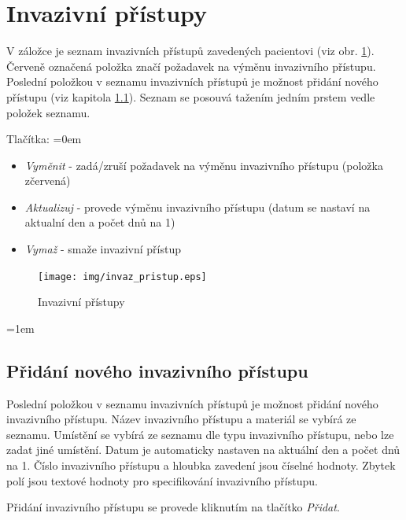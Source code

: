
\section{Invazivní přístupy}

V záložce je seznam invazivních přístupů zavedených pacientovi (viz obr. \ref{fig:pristupy}). Červeně označená položka značí požadavek na výměnu invazivního přístupu. Poslední položkou v seznamu invazivních přístupů je možnost přidání nového přístupu (viz kapitola \ref{sec:pridat_pristup}). Seznam se posouvá tažením jedním prstem vedle položek seznamu.

Tlačítka:
\parskip=0em
\begin{itemize}
	\item \emph{Vyměnit}		-	zadá/zruší požadavek na výměnu invazivního přístupu (položka zčervená)
	\item \emph{Aktualizuj}	-	provede výměnu invazivního přístupu (datum se nastaví na aktualní den a počet dnů na 1)
	\item \emph{Vymaž}			-	smaže invazivní přístup
\end{itemize}

\begin{figure}[H]
	\centering
	\texttt{[image: img/invaz\_pristup.eps]}
	\caption{Invazivní přístupy}
  \label{fig:pristupy}
\end{figure}
\parskip=1em

\subsection{Přidání nového invazivního přístupu}
\label{sec:pridat_pristup}

Poslední položkou v seznamu invazivních přístupů je možnost přidání nového invazivního přístupu. Název invazivního přístupu a materiál se vybírá ze seznamu. Umístění se vybírá ze seznamu dle typu invazivního přístupu, nebo lze zadat jiné umístění. Datum je automaticky nastaven na aktuální den a počet dnů na 1. Číslo invazivního přístupu a hloubka zavedení jsou číselné hodnoty. Zbytek polí jsou textové hodnoty pro specifikování invazivního přístupu.

Přidání invazivního přístupu se provede kliknutím na tlačítko \emph{Přidat}.


